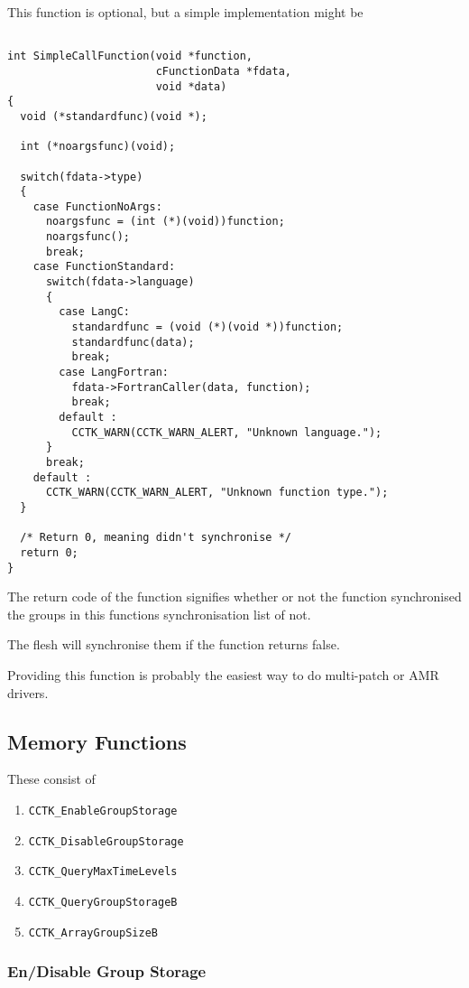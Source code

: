 This function is optional, but a simple implementation might be

\begin{verbatim}

int SimpleCallFunction(void *function,
                       cFunctionData *fdata,
                       void *data)
{
  void (*standardfunc)(void *);

  int (*noargsfunc)(void);

  switch(fdata->type)
  {
    case FunctionNoArgs:
      noargsfunc = (int (*)(void))function;
      noargsfunc();
      break;
    case FunctionStandard:
      switch(fdata->language)
      {
        case LangC:
          standardfunc = (void (*)(void *))function;
          standardfunc(data);
          break;
        case LangFortran:
          fdata->FortranCaller(data, function);
          break;
        default :
          CCTK_WARN(CCTK_WARN_ALERT, "Unknown language.");
      }
      break;
    default :
      CCTK_WARN(CCTK_WARN_ALERT, "Unknown function type.");
  }

  /* Return 0, meaning didn't synchronise */
  return 0;
}

\end{verbatim}

The return code of the function signifies whether or not the function
synchronised the groups in this functions synchronisation list of not.

The flesh will synchronise them if the function returns false.

Providing this function is probably the easiest way to do multi-patch or
AMR drivers.

\subsection{Memory Functions}

These consist of
\begin{enumerate}
\item{} {\tt CCTK\_EnableGroupStorage}
\item{} {\tt CCTK\_DisableGroupStorage}
\item{} {\tt CCTK\_QueryMaxTimeLevels}
\item{} {\tt CCTK\_QueryGroupStorageB}
\item{} {\tt CCTK\_ArrayGroupSizeB}
\end{enumerate}

\subsubsection{En/Disable Group Storage}

